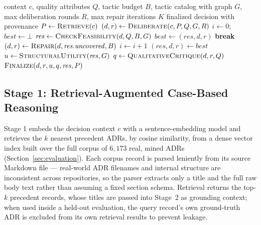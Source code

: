 \documentclass[lettersize,journal]{IEEEtran}
\begin{document}
\begin{algorithm}[t]
\caption{CADENCE}
\label{alg:cadence}
\begin{algorithmic}[1]
\REQUIRE context $c$, quality attributes $Q$, tactic budget $B$, tactic catalog with graph $G$, max deliberation rounds $R$, max repair iterations $K$
\ENSURE finalized decision with provenance
\STATE $P \gets \textsc{Retrieve}(c)$ 
\STATE $(d, r) \gets \textsc{Deliberate}(c, P, Q, G, R)$ 
\STATE $i \gets 0$; $\mathit{best} \gets \bot$
\LOOP
  \STATE $\mathit{res} \gets \textsc{CheckFeasibility}(d, Q, B, G)$ 
    \STATE $\mathit{best} \gets (\mathit{res}, d, r)$ 
  \ENDIF
    \STATE \textbf{break} 
  \ENDIF
  \STATE $(d, r) \gets \textsc{Repair}(d, \mathit{res}.\mathit{uncovered}, B)$ 
  \STATE $i \gets i + 1$
\ENDLOOP
\STATE $(\mathit{res}, d, r) \gets \mathit{best}$ 
\STATE $u \gets \textsc{StructuralUtility}(\mathit{res}, G)$ 
\STATE $q \gets \textsc{QualitativeCritique}(d, r, Q)$ 
\RETURN $\textsc{Finalize}(d, r, u, q, \mathit{res}, P)$
\end{algorithmic}
\end{algorithm}

\subsection{Stage 1: Retrieval-Augmented Case-Based Reasoning}

Stage 1 embeds the decision context $c$ with a sentence-embedding model and retrieves the $k$ nearest precedent ADRs, by cosine similarity, from a dense vector index built over the full corpus of $6{,}173$ real, mined ADRs (Section~\ref{sec:evaluation}). Each corpus record is parsed leniently from its source Markdown file --- real-world ADR filenames and internal structure are inconsistent across repositories, so the parser extracts only a title and the full raw body text rather than assuming a fixed section schema. Retrieval returns the top-$k$ precedent records, whose titles are passed into Stage~2 as grounding context; when used inside a held-out evaluation, the query record's own ground-truth ADR is excluded from its own retrieval results to prevent leakage.
\end{document}
